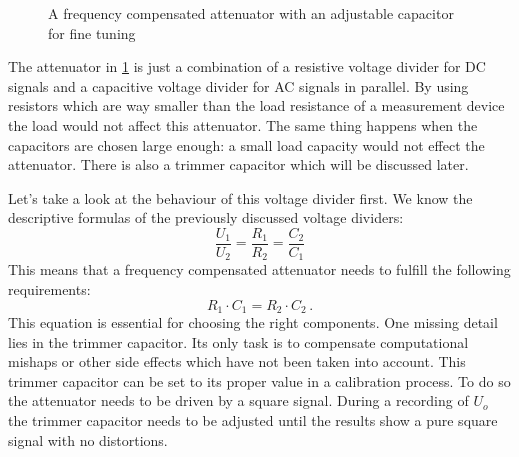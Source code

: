 \begin{figure}[htb]
	\centering
	\caption{A frequency compensated attenuator with an adjustable capacitor for fine tuning}
	\label{fig:frequency-compensated-attenuator}
\end{figure}

The attenuator in \cref{fig:frequency-compensated-attenuator} is just a combination of a resistive voltage divider for DC signals and a capacitive voltage divider for AC signals in parallel. By using resistors which are way smaller than the load resistance of a measurement device the load would not affect this attenuator. The same thing happens when the capacitors are chosen large enough: a small load capacity would not effect the attenuator. There is also a trimmer capacitor which will be discussed later.

Let's take a look at the behaviour of this voltage divider first. We know the descriptive formulas of the previously discussed voltage dividers:
\begin{equation*}
	\frac{U_1}{U_2} = \frac{R_1}{R_2} = \frac{C_2}{C_1}
\end{equation*}
This means that a frequency compensated attenuator needs to fulfill the following requirements:
\begin{equation}
	R_1 \cdot C_1 = R_2 \cdot C_2\,.
\end{equation}
This equation is essential for choosing the right components. One missing detail lies in the trimmer capacitor. Its only task is to compensate computational mishaps or other side effects which have not been taken into account. This trimmer capacitor can be set to its proper value in a calibration process. To do so the attenuator needs to be driven by a square signal. During a recording of $U_o$ the trimmer capacitor needs to be adjusted until the results show a pure square signal with no distortions.
